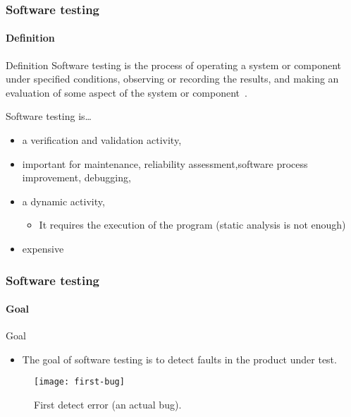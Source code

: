 \begin{frame}[parent={cmap:software-testing},hasnext=true,hasprev=true]
\frametitle{Software testing}
\framesubtitle{Definition}
\label{concept:software-testing}

\begin{block:concept}{Definition}
Software testing is the process of operating a system or component under
specified conditions, observing or recording the results, and  making
an evaluation of some aspect of the system or component~\cite{ieee610.12:1990}.
\end{block:concept}

\begin{block:fact}{Software testing is\dots{}}
\begin{itemize}
	\item a verification and validation activity,

	\item important for maintenance, reliability assessment,software process
	improvement, debugging,

	\item a dynamic activity,
	\begin{itemize}
		\item It requires the execution of the program (static analysis is
		not enough)
	\end{itemize}

	\item expensive~\cite{harrold:2000}
\end{itemize}
\end{block:fact}
\end{frame}



\begin{frame}
\frametitle{Software testing}
\framesubtitle{Goal}

\begin{block:fact}{Goal}
\begin{itemize}
	\item The goal of software testing is to detect faults in the product
	under test.
\end{itemize}
\end{block:fact}

\begin{figure}
	\centering
	\texttt{[image: first-bug]}
	\caption{First detect error (an actual bug).}
\end{figure}
\end{frame}


